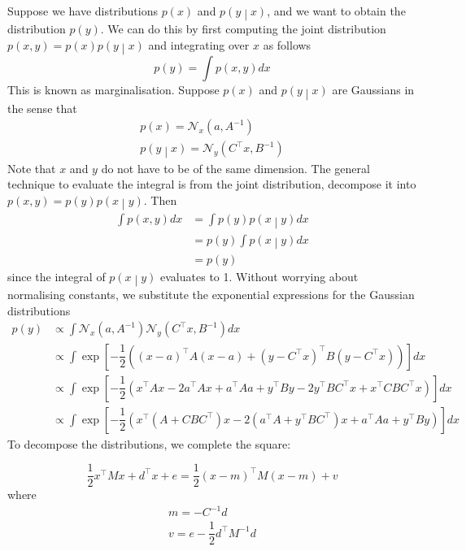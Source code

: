\documentclass[11pt]{report} %
\begin{document}
Suppose we have distributions $p\left(x\right)$ and $p\left(y\middle|x\right)$, and we want to obtain the distribution $p\left(y\right)$. We can do this by first computing the joint distribution $p\left(x, y\right) = p\left(x\right)p\left(y\middle|x\right)$ and integrating over $x$ as follows
\begin{equation}
p\left(y\right) = \int p\left(x, y\right)dx
\end{equation}
This is known as marginalisation. Suppose $p\left(x\right)$ and $p\left(y\middle|x\right)$ are Gaussians in the sense that
\begin{gather}
p\left(x\right) = \mathcal{N}_{x}\left(a, A^{-1}\right) \\
p\left(y\middle|x\right) = \mathcal{N}_{y}\left(C^{\top}x, B^{-1}\right)
\end{gather}
Note that $x$ and $y$ do not have to be of the same dimension. The general technique to evaluate the integral is from the joint distribution, decompose it into $p\left(x, y\right) = p\left(y\right)p\left(x\middle|y\right)$. Then
\begin{align}
\int p\left(x, y\right)dx &= \int p\left(y\right)p\left(x\middle|y\right)dx
\\
&= p\left(y\right) \int p\left(x\middle|y\right)dx \\
&= p\left(y\right)
\end{align}
since the integral of $p\left(x\middle|y\right)$ evaluates to 1. Without worrying about normalising constants, we substitute the exponential expressions for the Gaussian distributions
\begin{align}
p\left(y\right) &\propto \int\mathcal{N}_{x}\left(a,A^{-1}\right)\mathcal{N}_{y}\left(C^{\top}x,B^{-1}\right)dx \\
&\propto \int\exp\left[-\dfrac{1}{2}\left(\left(x-a\right)^{\top}A\left(x-a\right)+\left(y-C^{\top}x\right)^{\top}B\left(y-C^{\top}x\right)\right)\right]dx \\
&\propto \int\exp\left[-\dfrac{1}{2}\left(x^{\top}Ax-2a^{\top}Ax+a^{\top}Aa+y^{\top}By-2y^{\top}BC^{\top}x+x^{\top}CBC^{\top}x\right)\right]dx \\
&\propto \int\exp\left[-\dfrac{1}{2}\left(x^{\top}\left(A+CBC^{\top}\right)x-2\left(a^{\top}A+y^{\top}BC^{\top}\right)x+a^{\top}Aa+y^{\top}By\right)\right]dx
\end{align}
To decompose the distributions, we complete the square:
\begin{lemma}
\begin{equation}
\dfrac{1}{2}x^{\top}Mx + d^{\top}x + e = \dfrac{1}{2}\left(x - m\right)^{\top}M\left(x - m\right) + v
\end{equation}
where
\begin{gather}
m = -C^{-1}d \\
v= e - \dfrac{1}{2}d^{\top}M^{-1}d
\end{gather}
\end{lemma}
\end{document}
